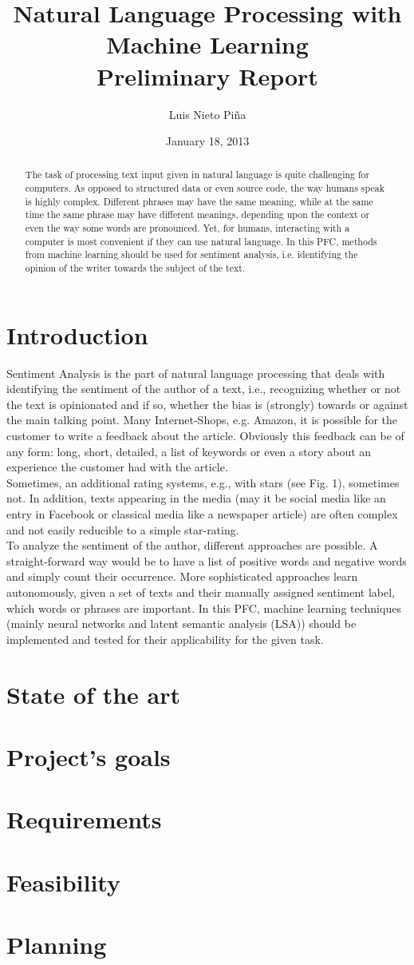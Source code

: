 \documentclass[10pt,a4paper,draft]{report}
\title{Natural Language Processing with Machine Learning\\Preliminary Report}
\author{Luis Nieto Pi\~na}
\date{January 18, 2013}
\begin{document}
\maketitle
\makeindex

\begin{abstract}
		The task of processing text input given in natural language is quite challenging for computers. As opposed to structured data or even source code, the way humans speak is highly complex. Different phrases may have the same meaning, while at the same time the same phrase may have different meanings, depending upon the context or even the way some words are pronounced. Yet, for humans, interacting with a computer is most convenient if they can use natural language. In this PFC, methods from machine learning should be used for sentiment analysis, i.e. identifying the opinion of the writer towards the subject of the text.
\end{abstract}

\chapter{Introduction}
	Sentiment Analysis is the part of natural language processing that deals with identifying the sentiment of the author of a text, i.e., recognizing whether or not the text is opinionated and if so, whether the bias is (strongly) towards or against the main talking point. Many Internet-Shops, e.g. Amazon, it is possible for the customer to write a feedback about the article. Obviously this feedback can be of any form: long, short, detailed, a list of keywords or even a story about an experience the customer had with the article.\\

	Sometimes, an additional rating systems, e.g., with stars (see Fig. 1), sometimes not. In addition, texts appearing in the media (may it be social media like an entry in Facebook or classical media like a newspaper article) are often complex and not easily reducible to a simple star-rating.\\

	To analyze the sentiment of the author, different approaches are possible. A straight-forward way would be to have a list of positive words and negative words and simply count their occurrence. More sophisticated approaches learn autonomously, given a set of texts and their manually assigned sentiment label, which words or phrases are important. In this PFC, machine learning techniques (mainly neural networks and latent semantic analysis (LSA))
should be implemented and tested for their applicability for the given task.
\chapter{State of the art}
\chapter{Project's goals}
\chapter{Requirements}
\chapter{Feasibility}
\chapter{Planning}
\end{document}
